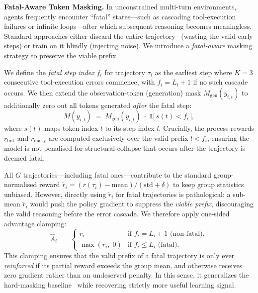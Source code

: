 \textbf{Fatal-Aware Token Masking.}
In unconstrained multi-turn environments, agents frequently encounter ``fatal'' states---such as cascading tool-execution failures or infinite loops---after which subsequent reasoning becomes meaningless. Standard approaches either discard the entire trajectory~\citep{huang2026vision} (wasting the valid early steps) or train on it blindly (injecting noise). We introduce a \emph{fatal-aware} masking strategy to preserve the viable prefix. 

We define the \emph{fatal step index} $f_i$ for trajectory $\tau_i$ as the earliest step where $K=3$ consecutive tool-execution errors commence, with $f_i = L_i+1$ if no such cascade occurs. We then extend the observation-token (generation) mask $M_{\text{gen}}(y_{i,t})$ to additionally zero out all tokens generated \emph{after} the fatal step:
{\small
\begin{equation}
  M(y_{i,t}) \;=\; M_{\text{gen}}(y_{i,t}) \;\cdot\; \mathbb{1}\bigl[\,s(t) < f_i\,\bigr],
  \label{eq:fatal-mask}
\end{equation}
}where $s(t)$ maps token index $t$ to its step index $l$.
Crucially, the process rewards $r_{\text{fmt}}$ and $r_{\text{query}}$ are computed exclusively over the valid prefix $l < f_i$, ensuring the model is not penalised for structural collapse that occurs after the trajectory is deemed fatal.


All $G$ trajectories---including fatal ones---contribute to the standard group-normalised reward $\widetilde{r}_i = (r(\tau_i) - \mathrm{mean})/(\mathrm{std} + \delta)$ to keep group statistics unbiased. However, directly using $\widetilde{r}_i$ for fatal trajectories is pathological: a sub-mean $\widetilde{r}_i$ would push the policy gradient to suppress the \emph{viable prefix}, discouraging the valid reasoning before the error cascade. We therefore apply one-sided advantage clamping:
{\small
\begin{equation}
  \hat{A}_i \;=\;
  \begin{cases}
    \widetilde{r}_i & \text{if } f_i = L_i+1 \text{ (non-fatal)},\\[3pt]
    \max(\widetilde{r}_i,\; 0) & \text{if } f_i \le L_i \text{ (fatal)}.
  \end{cases}
  \label{eq:advantage}
\end{equation}
}This clamping ensures that the valid prefix of a fatal trajectory is only ever \emph{reinforced} if its partial reward exceeds the group mean, and otherwise receives zero gradient rather than an undeserved penalty. In this sense, it generalizes the hard-masking baseline~\citep{huang2026vision} while recovering strictly more useful learning signal.


